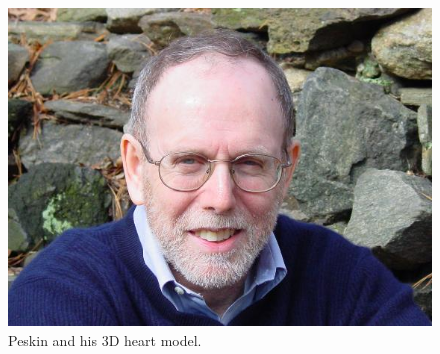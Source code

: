 \documentclass[a4paper,10pt]{article}
\begin{document}
\begin{figure}
\begin{center}
\hspace{0.1pc}
\includegraphics[scale=0.20]{figures/DSC01508_scale4.jpeg}
\end{center}
\caption{Peskin and his 3D heart model.}
\label{double}
\end{figure}
\end{document}
